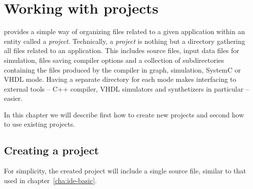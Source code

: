 
\chapter{Working with projects}
\label{cha:ide-project}

\caphy provides a simple way of organizing files related to a given application within an entity
called a \emph{project}. Technically, a \emph{project} is nothing but a directory gathering all
files related to an application. This includes \caph source files, input data files for simulation,
files saving compiler options and a collection of subdirectories containing the files
produced by the compiler in graph, simulation, SystemC or VHDL mode. Having a separate directory for
each mode makes interfacing to external tools -- C++ compiler, VHDL simulators and synthetizers in
particular -- easier.

\medskip
In this chapter we will describe first how to create new projects and second how to use existing projects.

\section{Creating a project}
\label{sec:creating-project}

For simplicity, the created project will include a single source file, similar to that used
in chapter~\ref{cha:ide-basic}.

